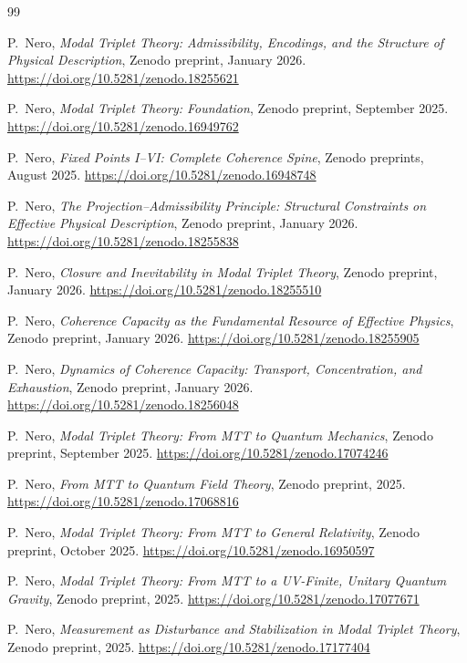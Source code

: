 \documentclass[11pt]{article}
\begin{document}
\begin{thebibliography}{99}

P.~Nero,
\emph{Modal Triplet Theory: Admissibility, Encodings, and the Structure of Physical Description},
Zenodo preprint, January 2026.
\url{https://doi.org/10.5281/zenodo.18255621}

P.~Nero,
\emph{Modal Triplet Theory: Foundation},
Zenodo preprint, September 2025.
\url{https://doi.org/10.5281/zenodo.16949762}

P.~Nero,
\emph{Fixed Points I--VI: Complete Coherence Spine},
Zenodo preprints, August 2025.
\url{https://doi.org/10.5281/zenodo.16948748}

P.~Nero,
\emph{The Projection--Admissibility Principle: Structural Constraints on Effective Physical Description},
Zenodo preprint, January 2026.
\url{https://doi.org/10.5281/zenodo.18255838}

P.~Nero,
\emph{Closure and Inevitability in Modal Triplet Theory},
Zenodo preprint, January 2026.
\url{https://doi.org/10.5281/zenodo.18255510}

P.~Nero,
\emph{Coherence Capacity as the Fundamental Resource of Effective Physics},
Zenodo preprint, January 2026.
\url{https://doi.org/10.5281/zenodo.18255905}

P.~Nero,
\emph{Dynamics of Coherence Capacity: Transport, Concentration, and Exhaustion},
Zenodo preprint, January 2026.
\url{https://doi.org/10.5281/zenodo.18256048}

P.~Nero,
\emph{Modal Triplet Theory: From MTT to Quantum Mechanics},
Zenodo preprint, September 2025.
\url{https://doi.org/10.5281/zenodo.17074246}

P.~Nero,
\emph{From MTT to Quantum Field Theory},
Zenodo preprint, 2025.
\url{https://doi.org/10.5281/zenodo.17068816}

P.~Nero,
\emph{Modal Triplet Theory: From MTT to General Relativity},
Zenodo preprint, October 2025.
\url{https://doi.org/10.5281/zenodo.16950597}

P.~Nero,
\emph{Modal Triplet Theory: From MTT to a UV-Finite, Unitary Quantum Gravity},
Zenodo preprint, 2025.
\url{https://doi.org/10.5281/zenodo.17077671}

P.~Nero,
\emph{Measurement as Disturbance and Stabilization in Modal Triplet Theory},
Zenodo preprint, 2025.
\url{https://doi.org/10.5281/zenodo.17177404}


\end{thebibliography}
\end{document}
